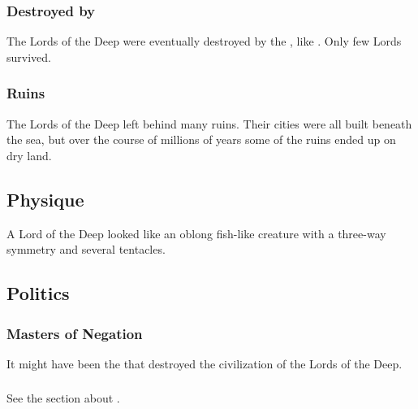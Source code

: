 \subsubsection{Destroyed by \noggyaleth}
The Lords of the Deep were eventually destroyed by the , like . 
Only few Lords survived.





\subsubsection{Ruins}
The Lords of the Deep left behind many ruins.
Their cities were all built beneath the sea, but over the course of millions of years some of the ruins ended up on dry land. 









\subsection{Physique}
A Lord of the Deep looked like an oblong fish-like creature with a three-way symmetry and several tentacles. 









\subsection{Politics}





\subsubsection{Masters of Negation}
It might have been the  that destroyed the civilization of the Lords of the Deep.





\subsubsection{\Shugul}
See the section about . 









